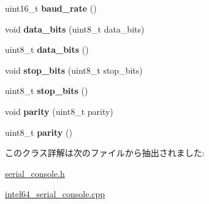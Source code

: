\begin{DoxyCompactItemize}
\item 
\hypertarget{classserial__console_ad090c8b90b07fc6ef25d816aa662b3a4}{}uint16\+\_\+t {\bfseries baud\+\_\+rate} ()\label{classserial__console_ad090c8b90b07fc6ef25d816aa662b3a4}

\item 
\hypertarget{classserial__console_acf0e666a73fcdbe99580e263a8c2c155}{}void {\bfseries data\+\_\+bits} (uint8\+\_\+t data\+\_\+bits)\label{classserial__console_acf0e666a73fcdbe99580e263a8c2c155}

\item 
\hypertarget{classserial__console_ac80a35d0277fe55a5fc1dd1b81d062c0}{}uint8\+\_\+t {\bfseries data\+\_\+bits} ()\label{classserial__console_ac80a35d0277fe55a5fc1dd1b81d062c0}

\item 
\hypertarget{classserial__console_a556085cc185db329b9fb2c1637c17268}{}void {\bfseries stop\+\_\+bits} (uint8\+\_\+t stop\+\_\+bits)\label{classserial__console_a556085cc185db329b9fb2c1637c17268}

\item 
\hypertarget{classserial__console_a43039f134f5b5b666b3a42a8fdad1484}{}uint8\+\_\+t {\bfseries stop\+\_\+bits} ()\label{classserial__console_a43039f134f5b5b666b3a42a8fdad1484}

\item 
\hypertarget{classserial__console_a8a6f476df2b731175674a571af2ad1bd}{}void {\bfseries parity} (uint8\+\_\+t parity)\label{classserial__console_a8a6f476df2b731175674a571af2ad1bd}

\item 
\hypertarget{classserial__console_ad98e06cb51a6b41fbc4ee5e3b6cfd309}{}uint8\+\_\+t {\bfseries parity} ()\label{classserial__console_ad98e06cb51a6b41fbc4ee5e3b6cfd309}

\end{DoxyCompactItemize}


このクラス詳解は次のファイルから抽出されました\+:\begin{DoxyCompactItemize}
\item 
\hyperlink{serial__console_8h}{serial\+\_\+console.\+h}\item 
\hyperlink{intel64__serial__console_8cpp}{intel64\+\_\+serial\+\_\+console.\+cpp}\end{DoxyCompactItemize}
